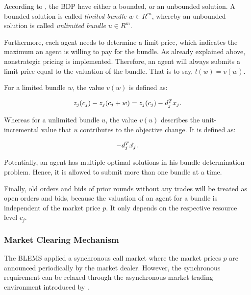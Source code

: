 According to , the BDP have either 
a bounded, or an unbounded solution. A bounded solution is called \textit{limited bundle} 
$w \in R^{m}$, whereby an unbounded solution is called \textit{unlimited bundle}
$u \in R^{m}$.

Furthermore, each agent needs to determine a limit price, which indicates
the maximum an agent is willing to pay for the bundle. 
As already explained above, nonstrategic pricing is implemented. 
Therefore, an agent will always submits a limit price equal to the valuation of the bundle. That is to say, $l(w) = v(w)$.

For a limited bundle $w$, the value $v(w)$ is defined as:

\begin{equation*}
 \begin{array}{ll@{}ll}
 z_{j}(c_{j}) - z_{j}(c_{j} + w) = z_{j}(c_{j}) - d_{j}^{T}x_{j}.
 \end{array}
\end{equation*}

Whereas for a unlimited bundle $u$, the value $v(u)$ describes the 
unit-incremental value that $u$ contributes to the objective change. It is defined
as:

\begin{equation*}
 \begin{array}{ll@{}ll}
 -d_{j}^{T}\hat{x_{j}}.
 \end{array}
\end{equation*}

Potentially, an agent has multiple optimal solutions in his bundle-determination problem. Hence, it is allowed to submit more than
one bundle at a time. 

Finally, old orders and bids of prior rounds without any trades will be treated 
as open orders and bids, because the valuation of an agent for a bundle is
independent of the market price $p$.
It only depends on the respective resource level $c_{j}$. 

\subsubsection{Market Clearing Mechanism}
\label{sec:market_clearing_mechanism}
The BLEMS applied a synchronous call market where the market prices $p$ are announced periodically by the market dealer. 
However, the synchronous requirement can be relaxed through the 
asynchronous market trading environment introduced by  . 


